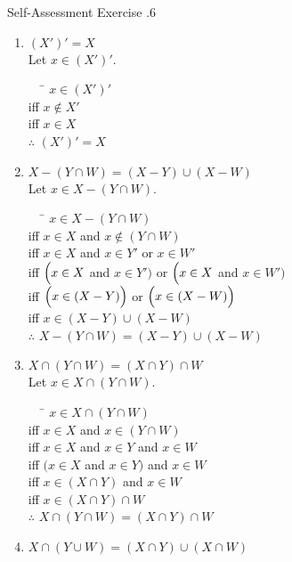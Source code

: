 \documentclass[../notes.tex]{subfiles}
\begin{document}
			\begin{exercisebox}{Self-Assessment Exercise \thechapter.6}
				\begin{enumerate}[label=(\alph*)]
					\item $(X')' = X$\\
						Let $x \in (X')'$.
						\begin{tabbing}
							$\quad$ \= $x \in (X')'$\\
							iff \> $x \notin X'$\\
							iff \> $x \in X$\\
							$\therefore$ \> $(X')' = X$
						\end{tabbing}
					\item $X - (Y \cap W) = (X - Y) \cup (X - W)$\\
						Let $x \in X - (Y \cap W)$.
						\begin{tabbing}
							$\quad$ \= $x \in X - (Y \cap W)$\\
							iff \> $x \in X$ and $x \notin (Y \cap W)$\\
							iff \> $x \in X$ and $x \in Y'$ or $x \in W'$\\
							iff \> $\Bigl(x \in X$ and $x \in Y'\Bigr)$ or $\Bigl(x \in X$ and $x \in W'\Bigr)$\\
							iff \> $\Bigl(x \in (X - Y)\Bigr)$ or $\Bigl(x \in (X - W)\Bigr)$\\
							iff \> $x \in (X - Y) \cup (X - W)$\\
							$\therefore$ \> $X - (Y \cap W) = (X - Y) \cup (X - W)$
						\end{tabbing}
					\item $X \cap (Y \cap W) = (X \cap Y) \cap W$\\
						Let $x \in X \cap (Y \cap W)$.
						\begin{tabbing}
							$\quad$ \= $x \in X \cap (Y \cap W)$\\
							iff \> $x \in X$ and $x \in (Y \cap W)$\\
							iff \> $x \in X$ and $x \in Y$ and $x \in W$\\
							iff \> $(x \in X$ and $x \in Y)$ and $x \in W$\\
							iff \> $x \in (X \cap Y)$ and $x \in W$\\
							iff \> $x \in (X \cap Y) \cap W$\\
							$\therefore$ \> $X \cap (Y \cap W) = (X \cap Y) \cap W$
						\end{tabbing}
					\item $X \cap (Y \cup W) = (X \cap Y) \cup (X \cap W)$\\

\end{enumerate}
\end{exercisebox}
\end{document}
